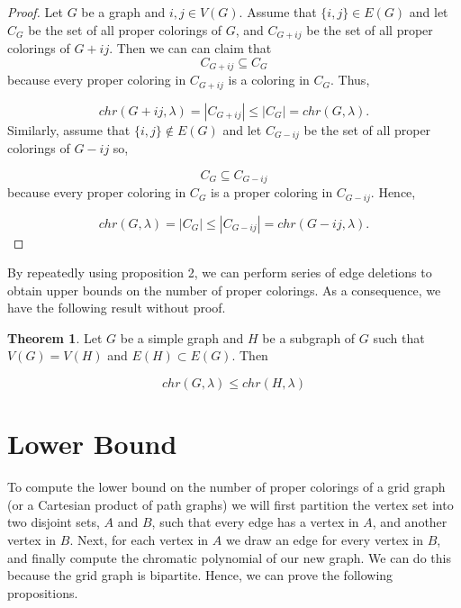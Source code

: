 \documentclass[11pt]{article}
\theoremstyle{definition}
\newtheorem{thm}{Theorem}
\begin{document}
\begin{proof}
Let $G$ be a graph and $i,j \in V(G)$. Assume that $\{i, j\} \in E(G)$ and let $C_{G}$ be the set of all proper colorings of $G$, and $C_{G + ij}$ be the set of all proper colorings of $G + ij$. Then we can can claim that 
\begin{equation}
C_{G + ij} \subseteq C_{G} \nonumber
\end{equation} because every proper coloring in $C_{G + ij}$ is a coloring in $C_{G}$. Thus,

\begin{equation}
chr(G + ij,\lambda) = |C_{G + ij}| \leq |C_{G}| = chr(G,\lambda). \nonumber
\end{equation} Similarly, assume that $\{i, j\} \notin E(G)$ and let $C_{G - ij}$ be the set of all proper colorings of $G - ij$ so,

\begin{equation}
C_{G} \subseteq C_{G - ij} \nonumber
\end{equation} because every proper coloring in $C_{G}$ is a proper coloring in $C_{G - ij}$. Hence,

\begin{equation}
chr(G,\lambda) = |C_{G}| \leq |C_{G - ij}| = chr(G - ij,\lambda). \nonumber
\end{equation}

\end{proof}

By repeatedly using proposition 2, we can perform series of edge deletions to obtain upper bounds on the number of proper colorings. As a consequence, we have the following result without proof.

\begin{thm}
Let $G$ be a simple graph and $H$ be a subgraph of $G$ such that $V(G) = V(H)$ and $E(H) \subset E(G)$. Then

\begin{equation}
chr(G,\lambda) \leq chr(H,\lambda)
\end{equation}

\end{thm}


\section{Lower Bound}
\label{sec:Lower Bound}

To compute the lower bound on the number of proper colorings of a grid graph (or a Cartesian product of path graphs) we will first partition the vertex set into two disjoint sets, $A$ and $B$, such that every edge has a vertex in $A$, and another vertex in $B$. Next, for each vertex in $A$ we draw an edge for every vertex in $B$, and finally compute the chromatic polynomial of our new graph. We can do this because the grid graph is bipartite. Hence, we can prove the following propositions.
\end{document}
